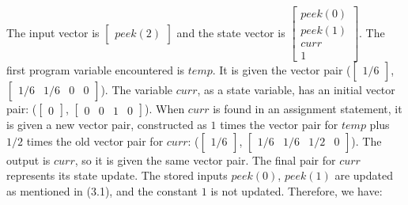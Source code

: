     The input vector is $\left [ \begin{array} {c} peek(2) \end{array}
\right ]$ and the state vector is $\left [ \begin{array} {c} peek(0) \\
peek(1) \\ curr \\ 1 \end{array} \right ]$. The first program
variable encountered is $temp$. It is given the vector pair
($\left [ \begin{array} {c} 1/6 \end{array} \right ]$, $\left [
\begin{array} {cccc} 1/6 & 1/6 & 0 & 0 \end{array} \right ]$). The
variable $curr$, as a state variable, has an initial vector pair:
($\left [ \begin{array} {c} 0 \end{array} \right ]$, $\left
[\begin{array} {cccc} 0 & 0 & 1 & 0
\end{array} \right ]$). When $curr$ is found in an assignment
statement, it is given a new vector pair, constructed as $1$ times
the vector pair for $temp$ plus $1/2$ times the old vector pair
for $curr$: ($\left [ \begin{array} {c} 1/6 \end{array} \right ]$,
$\left [ \begin{array} {cccc} 1/6 & 1/6 & 1/2 & 0 \end{array}
\right ]$). The output is $curr$, so it is given the same vector
pair. The final pair for $curr$ represents its state update. The
stored inputs $peek(0)$, $peek(1)$ are updated as mentioned in
(3.1), and the constant $1$ is not updated. Therefore, we have:
